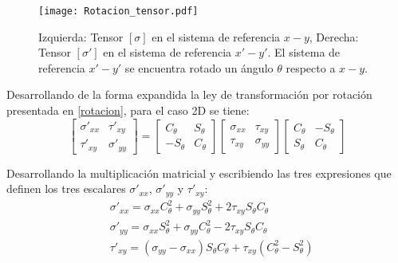 \documentclass[../notas medios.tex]{subfiles}
\begin{document}
\begin{figure}[H]
\centering
\texttt{[image: Rotacion\_tensor.pdf]}
\caption{Izquierda: Tensor $[\sigma]$ en el sistema de referencia $x-y$, Derecha: Tensor $[\sigma ']$ en el sistema de referencia $x'-y'$. El sistema de referencia $x'-y'$ se encuentra rotado un ángulo $\theta$ respecto a $x-y$.} 
\label{rota2D}
\end{figure} 
%
Desarrollando de la forma expandida la  ley de transformación por rotación presentada en \cref{rotacion}, para el caso 2D se tiene: \\
%
\begin{equation}
\left[ 
\begin{array}{ccc}
\sigma '_{xx} & \tau '_{xy} \\
\tau '_{xy} & \sigma '_{yy}
\end{array}
\right] =
\left[ 
\begin{array}{ccc}
C_\theta & S_\theta \\
-S_\theta & C_\theta
\end{array}
\right]
\left[ 
\begin{array}{ccc}
\sigma_{xx} & \tau_{xy} \\
\tau_{xy} & \sigma_{yy}
\end{array}
\right]
\left[ 
\begin{array}{ccc}
C_\theta & -S_\theta \\
S_\theta & C_\theta
\end{array}
\right]
\label{trans2d}
\end{equation}

Desarrollando la multiplicación matricial y escribiendo las tres expresiones que definen los tres escalares $\sigma ' _{xx}$, $\sigma ' _{yy}$ y $\tau ' _{xy}$:\\

\begin{equation}
\begin{aligned}
&\sigma ' _{xx} = \sigma _{xx} C^2 _\theta + \sigma _{yy} S^2 _\theta + 2 \tau _{xy} S _\theta C _\theta \\
&\sigma ' _{yy} = \sigma _{xx} S^2 _\theta + \sigma _{yy} C^2 _\theta - 2 \tau _{xy} S _\theta C _\theta \\
&\tau ' _{xy} = (\sigma _{yy} - \sigma _{xx}) S_\theta C _\theta +  \tau _{xy} (C^2 _\theta - S^2 _\theta) \\
\end{aligned}
\label{trans}
\end{equation}
%
\end{document}
